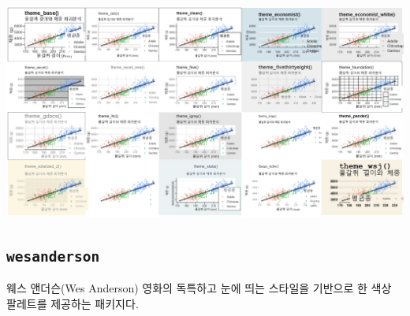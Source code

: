 \documentclass[
  letterpaper,
]{book}
\begin{document}
\includegraphics{images/ggtheme_gg.jpeg}

\hypertarget{wesanderson}{%
\subsection{\texorpdfstring{\texttt{wesanderson}}{wesanderson}}\label{wesanderson}}

웨스 앤더슨(Wes Anderson) 영화의 독특하고 눈에 띄는 스타일을 기반으로 한
색상 팔레트를 제공하는 패키지다.
\end{document}
